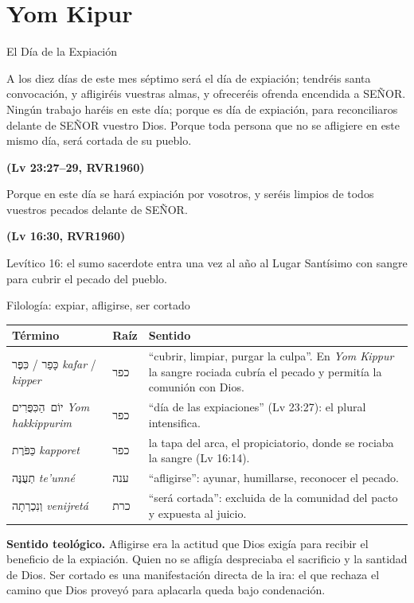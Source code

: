 \documentclass[hyperref={bookmarks=false},aspectratio=169]{beamer}
\newcommand{\heb}[1]{\mbox{\foreignlanguage{hebrew}{#1}}}
\newcommand{\SENOR}{S{\fontsize{0.78em}{1em}\selectfont EÑOR}}
\newcommand{\fuente}[1]{\par\hfill{\upshape\bfseries\footnotesize\textcolor{azul}{#1}}}
\begin{document}
\section{Yom Kipur}

\begin{frame}{El Día de la Expiación}
\begin{cita}A los diez días de este mes séptimo será el día de expiación; tendréis santa convocación, y afligiréis vuestras almas, y ofreceréis ofrenda encendida a \SENOR. Ningún trabajo haréis en este día; porque es día de expiación, para reconciliaros delante de \SENOR{} vuestro Dios. Porque toda persona que no se afligiere en este mismo día, será cortada de su pueblo.\fuente{(Lv 23:27--29, RVR1960)}\end{cita}
\begin{cita}Porque en este día se hará expiación por vosotros, y seréis limpios de todos vuestros pecados delante de \SENOR.\fuente{(Lv 16:30, RVR1960)}\end{cita}
\small Levítico 16: el sumo sacerdote entra una vez al año al Lugar Santísimo con sangre para cubrir el pecado del pueblo.
\end{frame}

\begin{frame}{Filología: expiar, afligirse, ser cortado}
\renewcommand{\arraystretch}{1.22}\scriptsize
\begin{tabular}{@{}>{\RaggedRight\arraybackslash}p{2.8cm}>{\RaggedRight\arraybackslash}p{1.2cm}>{\RaggedRight\arraybackslash}p{7.7cm}@{}}
\toprule
\textbf{Término} & \textbf{Raíz} & \textbf{Sentido} \\ \midrule
\heb{כָּפַר} / \heb{כִּפֶּר} \emph{kafar} / \emph{kipper} & \heb{כפר} & ``cubrir, limpiar, purgar la culpa''. En \emph{Yom Kippur} la sangre rociada cubría el pecado y permitía la comunión con Dios. \\
\heb{יוֹם הַכִּפֻּרִים} \emph{Yom hakkippurim} & \heb{כפר} & ``día de las expiaciones'' (Lv 23:27): el plural intensifica. \\
\heb{כַּפֹּרֶת} \emph{kapporet} & \heb{כפר} & la tapa del arca, el propiciatorio, donde se rociaba la sangre (Lv 16:14). \\
\heb{תְעֻנֶּה} \emph{te'unné} & \heb{ענה} & ``afligirse'': ayunar, humillarse, reconocer el pecado. \\
\heb{וְנִכְרְתָה} \emph{venijretá} & \heb{כרת} & ``será cortada'': excluida de la comunidad del pacto y expuesta al juicio. \\
\bottomrule
\end{tabular}\par\medskip
\small\RaggedRight
\textbf{Sentido teológico.} Afligirse era la actitud que Dios exigía para recibir el beneficio de la expiación. Quien no se afligía despreciaba el sacrificio y la santidad de Dios. Ser cortado es una manifestación directa de la ira: el que rechaza el camino que Dios proveyó para aplacarla queda bajo condenación.
\end{frame}
\end{document}
